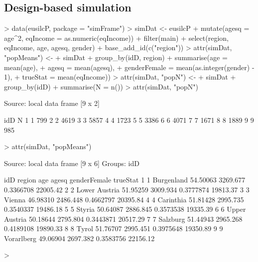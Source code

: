 \documentclass[article]{ajs}
\begin{document}
\subsection{Design-based simulation}
\begin{Schunk}
\begin{Sinput}
> data(eusilcP, package = "simFrame")
> simDat <- eusilcP %
+   mutate(agesq = age^2, eqIncome = as.numeric(eqIncome)) %
+   filter(main) %
+   select(region, eqIncome, age, agesq, gender) %
+   base_add_id(c("region"))
> attr(simDat, "popMeans") <- 
+   simDat %
+   group_by(idD, region) %
+   summarise(age = mean(age),
+             agesq = mean(agesq),
+             genderFemale = mean(as.integer(gender) - 1),
+             trueStat = mean(eqIncome))
> attr(simDat, "popN") <- 
+   simDat %
+   group_by(idD) %
+   summarise(N = n())
> attr(simDat, "popN")
\end{Sinput}
\begin{Soutput}
Source: local data frame [9 x 2]

  idD    N
1   1  799
2   2 4619
3   3 5857
4   4 1723
5   5 3386
6   6 4071
7   7 1671
8   8 1889
9   9  985
\end{Soutput}
\begin{Sinput}
> attr(simDat, "popMeans")
\end{Sinput}
\begin{Soutput}
Source: local data frame [9 x 6]
Groups: idD

  idD        region      age    agesq genderFemale trueStat
1   1    Burgenland 54.50063 3269.677    0.3366708 22005.42
2   2 Lower Austria 51.95259 3009.934    0.3777874 19813.37
3   3        Vienna 46.98310 2486.448    0.4662797 20395.84
4   4     Carinthia 51.81428 2995.735    0.3540337 19486.18
5   5        Styria 50.64087 2886.845    0.3573538 19335.39
6   6 Upper Austria 50.18644 2795.804    0.3443871 20517.29
7   7      Salzburg 51.44943 2965.268    0.4189108 19890.33
8   8         Tyrol 51.76707 2995.451    0.3975648 19350.89
9   9    Vorarlberg 49.06904 2697.382    0.3583756 22156.12
\end{Soutput}
\begin{Sinput}
> 
\end{Sinput}
\end{Schunk}

\begin{Schunk}
\end{Schunk}
\end{document}

